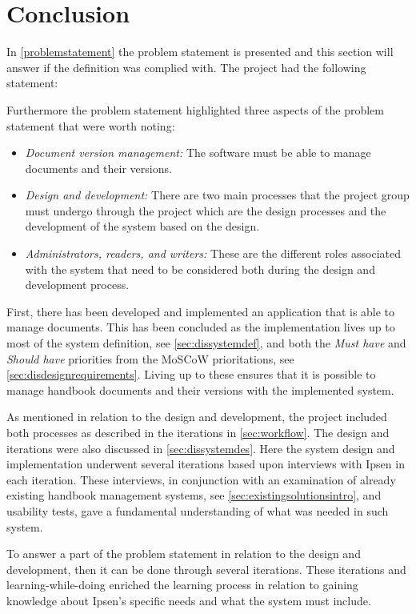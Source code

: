 \documentclass[../master.tex]{subfiles}
\begin{document}
\chapter{Conclusion}
In \cref{problemstatement} the problem statement is presented and this section will answer if the definition was complied with.
The project had the following statement:



Furthermore the problem statement highlighted three aspects of the problem statement that were worth noting:

\begin{itemize}
	\item
		\textit{Document version management:}
		The software must be able to manage documents and their versions.
	\item
		\textit{Design and development:}
		There are two main processes that the project group must undergo through the project which are the design processes and the development of the system based on the design.
	\item
		\textit{Administrators, readers, and writers:}
		These are the different roles associated with the system that need to be considered both during the design and development process.

\end{itemize}

First, there has been developed and implemented an application that is able to manage documents.
This has been concluded as the implementation lives up to most of the system definition, see \cref{sec:dissystemdef}, and both the \textit{Must have} and \textit{Should have} priorities from the MoSCoW prioritations, see \cref{sec:disdesignrequirements}.
Living up to these ensures that it is possible to manage handbook documents and their versions with the implemented system.

As mentioned in relation to the design and development, the project included both processes as described in the iterations in \cref{sec:workflow}.
The design and iterations were also discussed in \cref{sec:dissystemdes}.
Here the system design and implementation underwent several iterations based upon interviews with Ipsen in each iteration.
These interviews, in conjunction with an examination of already existing handbook management systems, see \cref{sec:existingsolutionsintro}, and usability tests, gave a fundamental understanding of what was needed in such system.

To answer a part of the problem statement in relation to the design and development, then it can be done through several iterations.
These iterations and learning-while-doing enriched the learning process in relation to gaining knowledge about Ipsen's specific needs and what the system must include.
\end{document}
